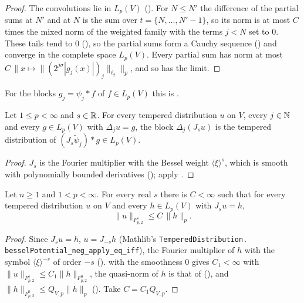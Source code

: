 \begin{proof}
\leanok
The convolutions lie in $L_p(V)$ (). For $N \leq N'$ the difference of the
partial sums at $N'$ and at $N$ is the sum over $t = \{N, \dots, N' - 1\}$, so its norm is at most
$C$ times the mixed norm of the weighted family with the terms $j < N$ set to $0$. These tails
tend to $0$ (), so the partial sums form a Cauchy sequence
() and converge in the complete space $L_p(V)$. Every partial sum has
norm at most $C \, \| x \mapsto \| (2^{j\sigma} |g_j(x)|)_j \|_{\ell_2} \|_p$, and so has the limit.
\end{proof}

For the blocks $g_j = \psi_j * f$ of $f \in L_p(V)$ this is .

\begin{lemma}
\label{lem:bessel-potential-distrib-blocks}
\leanok
{}
Let $1 \leq p < \infty$ and $s \in \mathbb{R}$. For every tempered distribution $u$ on $V$, every
$j \in \mathbb{N}$ and every $g \in L_p(V)$ with $\Delta_j u = g$, the block $\Delta_j(J_s u)$ is the
tempered distribution of $(J_s \tilde\psi_j) * g \in L_p(V)$.
\end{lemma}

\begin{proof}
\leanok
$J_s$ is the Fourier multiplier with the Bessel weight $\langle \xi \rangle^s$, which is smooth
with polynomially bounded derivatives (); apply
.
\end{proof}

\begin{theorem}
\label{thm:bessel-to-triebel-lizorkin-distr}
\leanok
{}
Let $n \geq 1$ and $1 < p < \infty$. For every real $s$ there is $C < \infty$ such that for every
tempered distribution $u$ on $V$ and every $h \in L_p(V)$ with $J_s u = h$,
\[
  \|u\|_{F^s_{p,2}} \leq C \, \|h\|_p .
\]
\end{theorem}

\begin{proof}
\leanok
Since $J_s u = h$, $u = J_{-s} h$ (Mathlib's \texttt{TemperedDistribution.\allowbreak
besselPotential\_\allowbreak neg\_\allowbreak apply\_\allowbreak eq\_\allowbreak iff}), the
Fourier multiplier of $h$ with the symbol $\langle \xi \rangle^{-s}$ of order $-s$
().  with the smoothness $0$ gives $C_1 < \infty$
with $\|u\|_{F^s_{p,2}} \leq C_1 \|h\|_{F^0_{p,2}}$, the quasi-norm of $h$ is that of
 (), and
$\|h\|_{F^0_{p,2}} \leq Q_{V,p} \|h\|_p$ (). Take
$C = C_1 Q_{V,p}$.
\end{proof}

